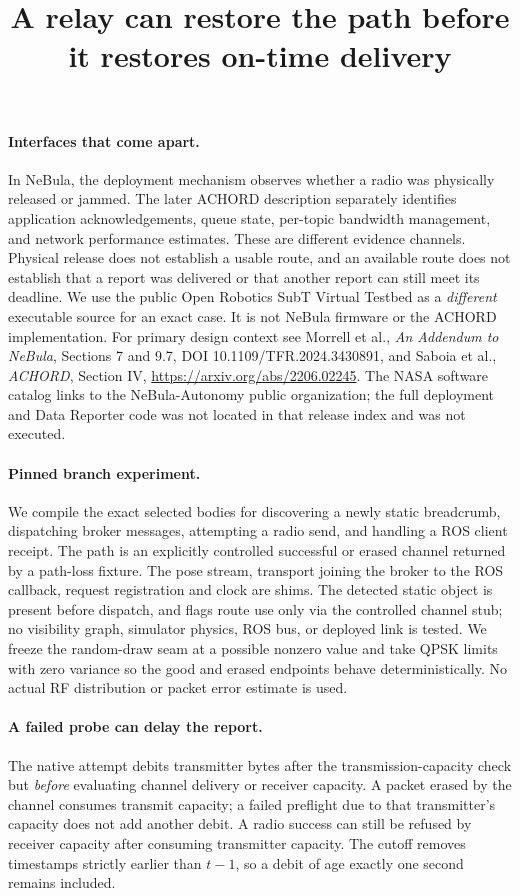 \documentclass{article}
\title{A relay can restore the path before it restores on-time delivery}
\begin{document}
\maketitle
\paragraph{Interfaces that come apart.}
In NeBula, the deployment mechanism observes whether a radio was physically released or jammed. The later ACHORD description separately identifies application acknowledgements, queue state, per-topic bandwidth management, and network performance estimates. These are different evidence channels. Physical release does not establish a usable route, and an available route does not establish that a report was delivered or that another report can still meet its deadline. We use the public Open Robotics SubT Virtual Testbed as a \emph{different} executable source for an exact case. It is not NeBula firmware or the ACHORD implementation. For primary design context see Morrell et al., \textit{An Addendum to NeBula}, Sections 7 and 9.7, DOI 10.1109/TFR.2024.3430891, and Saboia et al., \textit{ACHORD}, Section IV, \url{https://arxiv.org/abs/2206.02245}. The NASA software catalog links to the NeBula-Autonomy public organization; the full deployment and Data Reporter code was not located in that release index and was not executed.

\paragraph{Pinned branch experiment.}
We compile the exact selected bodies for discovering a newly static breadcrumb, dispatching broker messages, attempting a radio send, and handling a ROS client receipt. The path is an explicitly controlled successful or erased channel returned by a path-loss fixture. The pose stream, transport joining the broker to the ROS callback, request registration and clock are shims. The detected static object is present before dispatch, and flags route use only via the controlled channel stub; no visibility graph, simulator physics, ROS bus, or deployed link is tested. We freeze the random-draw seam at a possible nonzero value and take QPSK limits with zero variance so the good and erased endpoints behave deterministically. No actual RF distribution or packet error estimate is used.

\paragraph{A failed probe can delay the report.}
The native attempt debits transmitter bytes after the transmission-capacity check but \emph{before} evaluating channel delivery or receiver capacity. A packet erased by the channel consumes transmit capacity; a failed preflight due to that transmitter's capacity does not add another debit. A radio success can still be refused by receiver capacity after consuming transmitter capacity. The cutoff removes timestamps strictly earlier than \(t-1\), so a debit of age exactly one second remains included.
\end{document}
